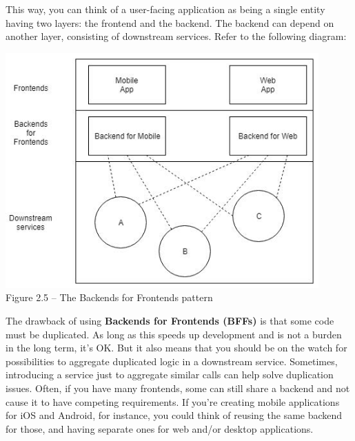 This way, you can think of a user-facing application as being a single entity having two layers: the frontend and the backend. The backend can depend on another layer, consisting of downstream services. Refer to the following diagram:


\begin{center}
\includegraphics[width=0.9\textwidth]{content/1/chapter2/images/5.jpg}\\
Figure 2.5 – The Backends for Frontends pattern
\end{center}

The drawback of using \textbf{Backends for Frontends (BFFs)} is that some code must be duplicated. As long as this speeds up development and is not a burden in the long term, it's OK. But it also means that you should be on the watch for possibilities to aggregate duplicated logic in a downstream service. Sometimes, introducing a service just to aggregate similar calls can help solve duplication issues. Often, if you have many frontends, some can still share a backend and not cause it to have competing requirements. If you're creating mobile applications for iOS and Android, for instance, you could think of reusing the same backend for those, and having separate ones for web and/or desktop applications.






















